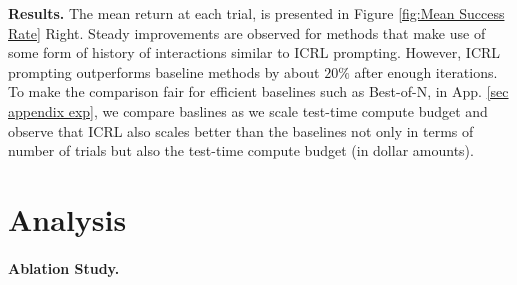 \documentclass{article} %
\newcommand{\0}{\mathbf{0}}
\begin{document}
\textbf{Results.}
The mean return at each trial, is presented in Figure \ref{fig:Mean Success Rate} Right. 
Steady improvements are observed for methods that make use of some form of history of interactions similar to ICRL prompting. 
However, ICRL prompting outperforms baseline methods by about $20\%$ after enough iterations. 
To make the comparison fair for efficient baselines such as Best-of-N, in App. \ref{sec appendix exp},
we compare baslines as we scale test-time compute budget and observe that ICRL also scales better than the baselines not only in terms of number of trials but also the test-time compute budget (in dollar amounts).









\section{Analysis}

\paragraph{Ablation Study.}
\end{document}
